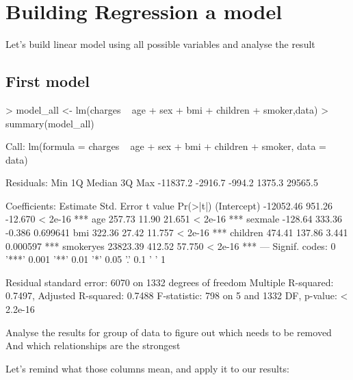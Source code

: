 \documentclass{article}
\begin{document}
\section{Building Regression a model}

Let's build linear model using all possible variables and analyse the result

\subsection{First model}
\begin{Schunk}
\begin{Sinput}
> model_all <- lm(charges ~ age + sex + bmi + children + smoker,data)
> summary(model_all)
\end{Sinput}
\begin{Soutput}
Call:
lm(formula = charges ~ age + sex + bmi + children + smoker, data = data)

Residuals:
     Min       1Q   Median       3Q      Max 
-11837.2  -2916.7   -994.2   1375.3  29565.5 

Coefficients:
             Estimate Std. Error t value Pr(>|t|)    
(Intercept) -12052.46     951.26 -12.670  < 2e-16 ***
age            257.73      11.90  21.651  < 2e-16 ***
sexmale       -128.64     333.36  -0.386 0.699641    
bmi            322.36      27.42  11.757  < 2e-16 ***
children       474.41     137.86   3.441 0.000597 ***
smokeryes    23823.39     412.52  57.750  < 2e-16 ***
---
Signif. codes:  0 '***' 0.001 '**' 0.01 '*' 0.05 '.' 0.1 ' ' 1

Residual standard error: 6070 on 1332 degrees of freedom
Multiple R-squared:  0.7497,	Adjusted R-squared:  0.7488 
F-statistic:   798 on 5 and 1332 DF,  p-value: < 2.2e-16
\end{Soutput}
\end{Schunk}

Analyse the results for group of data to figure out which needs to be removed
And which relationships are the strongest 

Let's remind what those columns mean, and apply it to our results:
\end{document}
